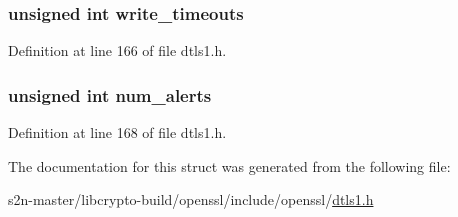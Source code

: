 \subsubsection[{\texorpdfstring{write\+\_\+timeouts}{write_timeouts}}]{\setlength{\rightskip}{0pt plus 5cm}unsigned int write\+\_\+timeouts}\hypertarget{structdtls1__timeout__st_a45ce047540bcfd023c6be14f409f1cd3}{}\label{structdtls1__timeout__st_a45ce047540bcfd023c6be14f409f1cd3}


Definition at line 166 of file dtls1.\+h.

\subsubsection[{\texorpdfstring{num\+\_\+alerts}{num_alerts}}]{\setlength{\rightskip}{0pt plus 5cm}unsigned int num\+\_\+alerts}\hypertarget{structdtls1__timeout__st_a9dc8fb0664e8d20a381e94cdf1623019}{}\label{structdtls1__timeout__st_a9dc8fb0664e8d20a381e94cdf1623019}


Definition at line 168 of file dtls1.\+h.



The documentation for this struct was generated from the following file\+:\begin{DoxyCompactItemize}
\item 
s2n-\/master/libcrypto-\/build/openssl/include/openssl/\hyperlink{include_2openssl_2dtls1_8h}{dtls1.\+h}\end{DoxyCompactItemize}
